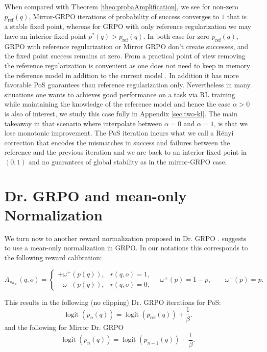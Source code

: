\documentclass[11pt,reqno]{amsart}
\DeclareMathOperator{\logit}{logit}
\begin{document}
When compared with Theorem \ref{theo:probaAmplification}, we see for non-zero $p_{\mathrm{ref}}(q)$, Mirror-GRPO iterations of probability of success converges to $1$ that is a stable fixed point, whereas for GRPO with only reference regularization we may have an interior fixed point $p^*(q)> p_{\mathrm{ref}}(q)$. In both case for zero $p_{\mathrm{ref}}(q)$, GRPO with reference regularization or Mirror GRPO don't create successes, and the fixed point success remains at zero. From a practical point of view removing the reference regularization is convenient as one does not need to keep in memory the reference model in addition to the current model . In addition it has more favorable PoS guarantees than reference regularization only. Nevertheless in many situations one wants to achieves good performance on a task via RL training while maintaining the knowledge of the reference model and hence the case $\alpha>0$ is also of interest, we study this case fully in  Appendix \ref{sec:two-kl}. The main takeaway in that scenario where interpolate between $\alpha=0$ and $\alpha=1$, is that we lose monotonic improvement.  The PoS iteration incurs what we call  a Rényi correction  that  encodes the mismatches in success and failures between the reference and the previous iteration and we are back to an interior fixed point in $(0,1)$ and no guarantees of global stability as in the mirror-GRPO case.  

\section{Dr. GRPO and mean-only Normalization}\label{sec:meanonly}

We turn now to another reward normalization proposed in Dr. GRPO \citep{liu2025understanding}. \citet{liu2025understanding} suggests to use a mean-only normalization in GRPO. In our notations this corresponds to the following reward calibration: 

\begin{equation}
\label{eq:cases}
A_{\pi_{\theta_{\text{old}}}}(q,o)=
\begin{cases}
+\omega^+(p(q)), & r(q,o)=1,\\
-\omega^-(p(q)), & r(q,o)=0,
\end{cases}
\quad
\omega^+(p)=1-p,
\qquad
\omega^-(p)=p.
\end{equation}

This results in the following (no clipping) Dr. GRPO iterations for PoS: 
\[ \logit(p_{n}(q)) = \logit (p_{\mathrm{ref}}(q)) + \frac{1}{\beta}.\]
and the following for Mirror Dr. GRPO
\[ \logit(p_{n}(q)) = \logit (p_{n-1}(q)) + \frac{1}{\beta}.\]
\end{document}
